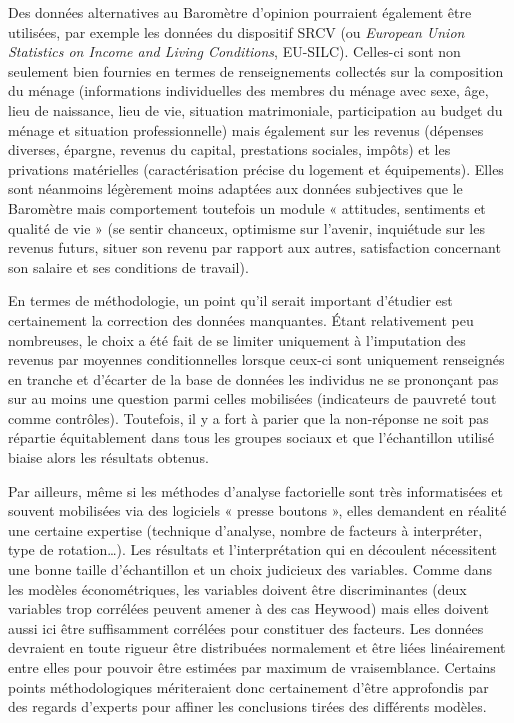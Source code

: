 \documentclass[12pt,a4paper]{reedthesis}
\begin{document}
Des données alternatives au Baromètre d'opinion pourraient également être utilisées, par exemple les données du dispositif SRCV (ou \emph{European Union Statistics on Income and Living Conditions}, EU-SILC). Celles-ci sont non seulement bien fournies en termes de renseignements collectés sur la composition du ménage (informations individuelles des membres du ménage avec sexe, âge, lieu de naissance, lieu de vie, situation matrimoniale, participation au budget du ménage et situation professionnelle) mais également sur les revenus (dépenses diverses, épargne, revenus du capital, prestations sociales, impôts) et les privations matérielles (caractérisation précise du logement et équipements). Elles sont néanmoins légèrement moins adaptées aux données subjectives que le Baromètre mais comportement toutefois un module « attitudes, sentiments et qualité de vie » (se sentir chanceux, optimisme sur l'avenir, inquiétude sur les revenus futurs, situer son revenu par rapport aux autres, satisfaction concernant son salaire et ses conditions de travail).

En termes de méthodologie, un point qu'il serait important d'étudier est certainement la correction des données manquantes. Étant relativement peu nombreuses, le choix a été fait de se limiter uniquement à l'imputation des revenus par moyennes conditionnelles lorsque ceux-ci sont uniquement renseignés en tranche et d'écarter de la base de données les individus ne se prononçant pas sur au moins une question parmi celles mobilisées (indicateurs de pauvreté tout comme contrôles). Toutefois, il y a fort à parier que la non-réponse ne soit pas répartie équitablement dans tous les groupes sociaux et que l'échantillon utilisé biaise alors les résultats obtenus.

Par ailleurs, même si les méthodes d'analyse factorielle sont très informatisées et souvent mobilisées via des logiciels « presse boutons », elles demandent en réalité une certaine expertise (technique d'analyse, nombre de facteurs à interpréter, type de rotation\ldots). Les résultats et l'interprétation qui en découlent nécessitent une bonne taille d'échantillon et un choix judicieux des variables. Comme dans les modèles économétriques, les variables doivent être discriminantes (deux variables trop corrélées peuvent amener à des cas Heywood) mais elles doivent aussi ici être suffisamment corrélées pour constituer des facteurs. Les données devraient en toute rigueur être distribuées normalement et être liées linéairement entre elles pour pouvoir être estimées par maximum de vraisemblance. Certains points méthodologiques mériteraient donc certainement d'être approfondis par des regards d'experts pour affiner les conclusions tirées des différents modèles.
\end{document}

